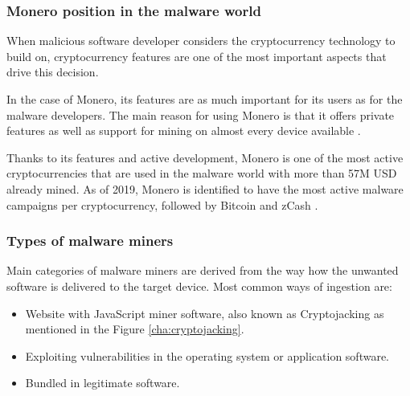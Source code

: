 \documentclass[
  printed, %
  table,   %
  lof,     %
  lot,     %
           oneside, color
]{fithesis3}
\begin{document}
\subsubsection{Monero position in the malware world}
When malicious software developer considers the cryptocurrency technology to build on, cryptocurrency features are one of the most important aspects that drive this decision.

In the case of Monero, its features are as much important for its users as for the malware developers. The main reason for using Monero is that it offers private features as well as support for mining on almost every device available \cite{eskandari2018first}.

Thanks to its features and active development, Monero is one of the most active cryptocurrencies that are used in the malware world with more than 57M USD already mined. As of 2019, Monero is identified to have the most active malware campaigns per cryptocurrency, followed by Bitcoin and zCash \cite{konoth2019malicious}.
\vspace{-0.6em}
\subsubsection{Types of malware miners}
Main categories of malware miners are derived from the way how the unwanted software is delivered to the target device. Most common ways of ingestion are:
\begin{itemize}
\itemsep0em
\item Website with JavaScript miner software, also known as Cryptojacking as mentioned in the Figure \ref{cha:cryptojacking}. 
\item Exploiting vulnerabilities in the operating system or application software.
\item Bundled in legitimate software.
\end{itemize}


\end{document}
